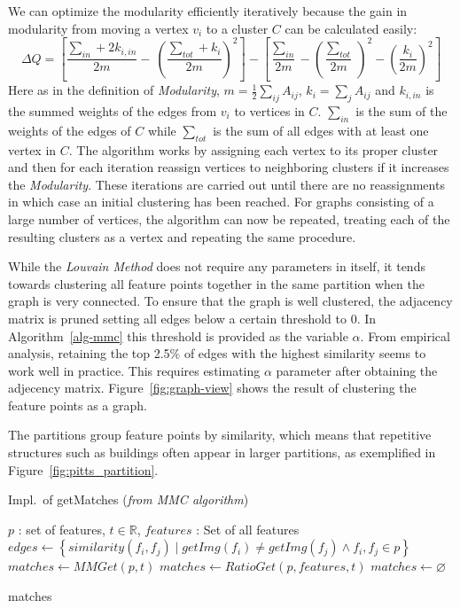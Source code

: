We can optimize the modularity efficiently iteratively because the gain 
in modularity from moving a vertex $v_i$ to a cluster $C$ can be 
calculated easily:
\begin{equation*}
	\Delta Q = \left[ \frac{\sum_{in} + 2 k_{i,in}}{2m} - \
    \left(\frac{\sum_{tot} + k_i}{2m} \right)^2 \right]
	- \left[\frac{\sum_{in}}{2m} - \left(\frac{\sum_{tot}}{2m} \
	\right)^2 - \left( \frac{k_i}{2m} \right)^2 \right]
\end{equation*}
Here as in the definition of \emph{Modularity}, $m=\frac{1}{2} \sum_{ij} 
A_{ij}$, $k_i = \sum_j A_{ij}$ and $k_{i,in}$ is the summed weights of 
the edges from $v_i$ to vertices in $C$.  $\sum_{in}$ is the sum of the 
weights of the edges of $C$ while $\sum_{tot}$ is the sum of all edges 
with at least one vertex in $C$.  The algorithm works by assigning each 
vertex to its proper cluster and then for each iteration reassign 
vertices to neighboring clusters if it increases the \emph{Modularity}.  
These iterations are carried out until there are no reassignments in 
which case an initial clustering has been reached.  For graphs 
consisting of a large number of vertices, the algorithm can now be 
repeated, treating each of the resulting clusters as a vertex and 
repeating the same procedure.

While the \emph{Louvain Method} does not require any parameters in 
itself, it tends towards clustering all feature points together in the 
same partition when the graph is very connected.  To ensure that the 
graph is well clustered, the adjacency matrix is pruned setting all 
edges below a certain threshold to $0$. In Algorithm~\ref{alg-mmc} this 
threshold is provided as the variable $\alpha$.  From empirical 
analysis, retaining the top 2.5\% of edges with the highest similarity 
seems to work well in practice. This requires estimating $\alpha$ 
parameter after obtaining the adjecency matrix.  
Figure~\ref{fig:graph-view} shows the result of clustering the feature 
points as a graph.

The partitions group feature points by similarity, which means that 
repetitive structures such as buildings often appear in larger 
partitions, as exemplified in Figure~\ref{fig:pitts_partition}.

\begin{algorithm}[t]
\caption{Impl.\ of getMatches (\emph{from MMC algorithm})}
\label{alg-getmatches}
    \begin{algorithmic}
    \Require $p$ : set of features, $t\in \mathbb{R}$, $features$ : Set of 
    all features
    \State $edges \gets \left\{similarity(f_i, f_j) \mid getImg(f_i)
        \neq getImg(f_j) \wedge f_i, f_j \in p \right\}$
    \If{$\left\vert edges \right\vert > 1$}
        \State $matches \gets MMGet(p, t)$
        \State $matches \gets RatioGet(p, features, t)$
    \Else
        \State $matches \gets \varnothing$
    \EndIf

    \Return matches
    \end{algorithmic}
\end{algorithm}

